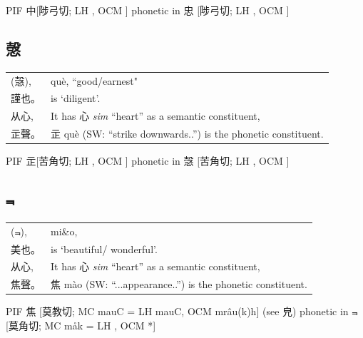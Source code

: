 PIF    中[陟弓切; LH {}, OCM {}] phonetic in 忠 [陟弓切; LH {}, OCM {}]

\subsection{愨}


\begin{tabular}{ll}
({\Large{愨}}), & què, ``good/earnest" \\
謹也。 & is `diligent'. %
\\
从心, & It has {\Large{心}} {\textit{sim}} ``heart'' as a semantic constituent, \\
㱏聲。 & {\Large{㱏}} què (SW: ``strike downwards..'') is the phonetic constituent.
\end{tabular}

PIF     㱏[苦角切; LH {}, OCM {}] phonetic in 愨 [苦角切; LH {}, OCM {}]


\subsection{⫬}


\begin{tabular}{ll}
(⫬), & mi\&o, \\
美也。 & is `beautiful/ wonderful'. \\
从心, & It has {\Large{心}} {\textit{sim}} ``heart'' as a semantic constituent, \\
焦聲。 &	{\Large{焦}} mào (SW: ``...appearance..'') is the phonetic constituent.
\end{tabular}

PIF     焦 [莫教切;  MC  mauC  =  LH  mauC,  OCM mrâu(k)h]  (see  皃)  phonetic  in  ⫬ [莫角切; MC måk = LH {}, OCM *{}]

